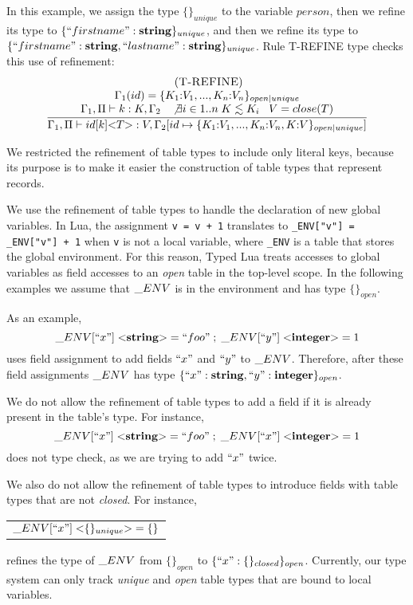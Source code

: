 In this example, we assign the type $\{\}_{unique}$ to the variable
$person$, then we refine its type to $\{``firstname":\mathbf{string}\}_{unique}$,
and then we refine its type to $\{``firstname":\mathbf{string}, ``lastname":\mathbf{string}\}_{unique}$.
Rule \textsc{T-REFINE} type checks this use of refinement:
\[
\begin{array}{c}
\; (\textsc{T-REFINE})\\
\dfrac{\begin{array}{c}
       \Gamma_{1}(id) = \{ K_{1}{:}V_{1}, ..., K_{n}{:}V_{n} \}_{open|unique}\\
       \Gamma_{1}, \Pi \vdash k:K, \Gamma_{2} \;\;\;
       \not \exists i \in 1..n \; K \lesssim K_{i} \;\;\;
       V = close(T)
       \end{array}}
      {\Gamma_{1}, \Pi \vdash id[k] {<}T{>}:V, \Gamma_{2}[id \mapsto \{ K_{1}{:}V_{1}, ..., K_{n}{:}V_{n}, K{:}V\}_{open|unique}]}
\end{array}
\]

We restricted the refinement of table types to include only literal
keys, because its purpose is to make it easier the construction of
table types that represent records.

We use the refinement of table types to handle the declaration of
new global variables.
In Lua, the assignment \texttt{v = v + 1} translates to
\texttt{\string_ENV["v"] = \string_ENV["v"] + 1} when \texttt{v}
is not a local variable, where \texttt{\string_ENV} is a table
that stores the global environment.
For this reason, Typed Lua treats accesses to global variables as field accesses
to an \emph{open} table in the top-level scope.
In the following examples we assume that $\string_ENV$ is in the
environment and has type $\{\}_{open}$.

As an example,
\[
\string_ENV[``x"] \; {<}\String{>} = ``foo" \;;\; \string_ENV[``y"] \; {<}\Integer{>} = 1
\]
uses field assignment to add fields $``x"$ and $``y"$ to $\string_ENV$.
Therefore, after these field assignments $\string_ENV$ has type
$\{``x":\mathbf{string}, ``y":\mathbf{integer}\}_{open}$.

We do not allow the refinement of table types to add a field if it is
already present in the table's type.
For instance,
\[
\string_ENV[``x"] \; {<}\String{>} = ``foo" \;;\; \string_ENV[``x"] \; {<}\Integer{>} = 1
\]
does not type check, as we are trying to add $``x"$ twice.

We also do not allow the refinement of table types to introduce
fields with table types that are not \emph{closed}.
For instance,
\begin{center}
\begin{tabular}{l}
$\string_ENV[``x"] \; {<}\{\}_{unique}{>} = \{\}$
\end{tabular}
\end{center}
refines the type of $\string_ENV$ from $\{\}_{open}$ to $\{``x":\{\}_{closed}\}_{open}$.
Currently, our type system can only track \emph{unique} and
\emph{open} table types that are bound to local variables.

